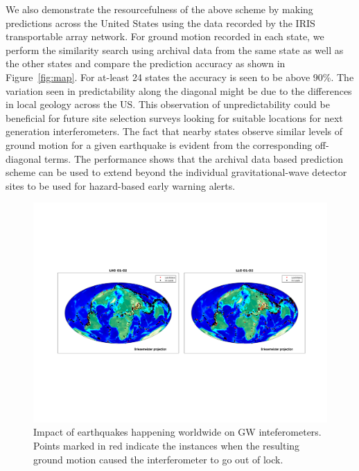 \documentclass[preprint, aps, showpacs]{revtex4-1}
\begin{document}
We also demonstrate the resourcefulness  of the above scheme by making predictions across the United States using the data recorded by the IRIS transportable array network. For ground motion recorded in each state, we perform the similarity search using archival data from the same state as well as the other states and compare the prediction accuracy as shown in Figure~\ref{fig:map}.  For at-least 24 states the accuracy is seen to be above 90\%. The variation seen in predictability along the diagonal might be due to the differences in local geology across the US. This observation of unpredictability could be beneficial for future site selection surveys looking for suitable locations for next generation interferometers. The fact that nearby states observe similar levels of ground motion for a given earthquake is evident from the corresponding off-diagonal terms.  
The performance shows that the archival data based prediction scheme can be used to extend beyond the individual gravitational-wave detector sites to be used for hazard-based early warning alerts.

\begin{figure}[!htb]
\hspace*{-0.5cm}
 \includegraphics[width=\textwidth]{./plots/EQ_Distribution.pdf}
 \caption{Impact of earthquakes happening worldwide on GW inteferometers. Points marked in red indicate the instances when the resulting ground motion caused the interferometer to go out of lock.}
 \label{fig:lockloss_distribution}
\end{figure}
\end{document}
